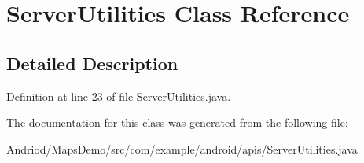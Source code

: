 \hypertarget{classcom_1_1example_1_1android_1_1apis_1_1_server_utilities}{\section{Server\-Utilities Class Reference}
\label{classcom_1_1example_1_1android_1_1apis_1_1_server_utilities}
}


\subsection{Detailed Description}


Definition at line 23 of file Server\-Utilities.\-java.



The documentation for this class was generated from the following file\-:\begin{DoxyCompactItemize}
\item 
Andriod/\-Maps\-Demo/src/com/example/android/apis/Server\-Utilities.\-java\end{DoxyCompactItemize}
